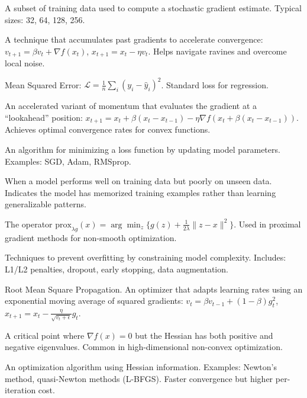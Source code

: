 \documentclass[../main.tex]{subfiles}
\begin{document}
\begin{description}[style=nextline, leftmargin=2cm, labelwidth=1.8cm]
\item[Mini-batch]
A subset of training data used to compute a stochastic gradient estimate. Typical sizes: 32, 64, 128, 256.

\item[Momentum]
A technique that accumulates past gradients to accelerate convergence: $v_{t+1} = \beta v_t + \nabla f(x_t)$, $x_{t+1} = x_t - \eta v_t$. Helps navigate ravines and overcome local noise.

\item[MSE Loss]
Mean Squared Error: $\mathcal{L} = \frac{1}{n}\sum_i (y_i - \hat{y}_i)^2$. Standard loss for regression.

\item[Nesterov Momentum]
An accelerated variant of momentum that evaluates the gradient at a ``lookahead'' position: $x_{t+1} = x_t + \beta(x_t - x_{t-1}) - \eta\nabla f(x_t + \beta(x_t - x_{t-1}))$. Achieves optimal convergence rates for convex functions.

\item[Optimizer]
An algorithm for minimizing a loss function by updating model parameters. Examples: SGD, Adam, RMSprop.

\item[Overfitting]
When a model performs well on training data but poorly on unseen data. Indicates the model has memorized training examples rather than learning generalizable patterns.

\item[Proximal Operator]
The operator $\text{prox}_{\lambda g}(x) = \arg\min_z \{g(z) + \frac{1}{2\lambda}\|z-x\|^2\}$. Used in proximal gradient methods for non-smooth optimization.

\item[Regularization]
Techniques to prevent overfitting by constraining model complexity. Includes: L1/L2 penalties, dropout, early stopping, data augmentation.

\item[RMSprop]
Root Mean Square Propagation. An optimizer that adapts learning rates using an exponential moving average of squared gradients: $v_t = \beta v_{t-1} + (1-\beta)g_t^2$, $x_{t+1} = x_t - \frac{\eta}{\sqrt{v_t + \epsilon}}g_t$.

\item[Saddle Point]
A critical point where $\nabla f(x) = 0$ but the Hessian has both positive and negative eigenvalues. Common in high-dimensional non-convex optimization.

\item[Second-Order Method]
An optimization algorithm using Hessian information. Examples: Newton's method, quasi-Newton methods (L-BFGS). Faster convergence but higher per-iteration cost.


\end{description}
\end{document}

